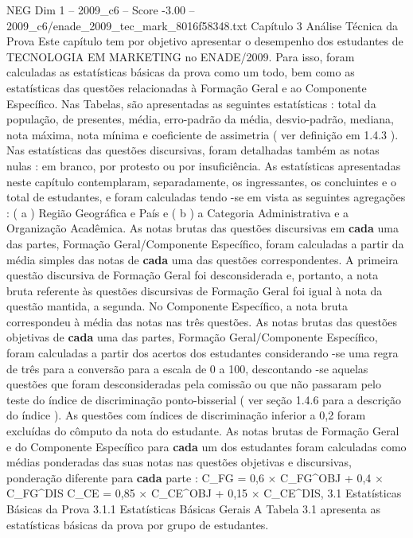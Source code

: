 \begin{textsample}{NEG Dim 1 – 2009\_c6 – Score -3.00 – 2009\_c6/enade\_2009\_tec\_mark\_8016f58348.txt}  \label{ex:f1_neg_214}
Capítulo 3 Análise Técnica da Prova Este capítulo tem por objetivo apresentar o desempenho dos estudantes de TECNOLOGIA EM MARKETING no ENADE/2009.
Para isso, foram calculadas as estatísticas básicas da prova como um todo, bem como as estatísticas das questões relacionadas à Formação Geral e ao Componente Específico.
Nas Tabelas, são apresentadas as seguintes estatísticas : total da população, de presentes, média, erro-padrão da média, desvio-padrão, mediana, nota máxima, nota mínima e coeficiente de assimetria ( ver definição em 1.4.3 ).
Nas estatísticas das questões discursivas, foram detalhadas também as notas nulas : em branco, por protesto ou por insuficiência.
As estatísticas apresentadas neste capítulo contemplaram, separadamente, os ingressantes, os concluintes e o total de estudantes, e foram calculadas tendo -se em vista as seguintes agregações : ( a ) Região Geográfica e País e ( b ) a Categoria Administrativa e a Organização Acadêmica.
As notas brutas das questões discursivas em \textbf{cada} uma das partes, Formação Geral/Componente Específico, foram calculadas a partir da média simples das notas de \textbf{cada} uma das questões correspondentes.
A primeira questão discursiva de Formação Geral foi desconsiderada e, portanto, a nota bruta referente às questões discursivas de Formação Geral foi igual à nota da questão mantida, a segunda.
No Componente Específico, a nota bruta correspondeu à média das notas nas três questões.
As notas brutas das questões objetivas de \textbf{cada} uma das partes, Formação Geral/Componente Específico, foram calculadas a partir dos acertos dos estudantes considerando -se uma regra de três para a conversão para a escala de 0 a 100, descontando -se aquelas questões que foram desconsideradas pela comissão ou que não passaram pelo teste do índice de discriminação ponto-bisserial ( ver seção 1.4.6 para a descrição do índice ).
As questões com índices de discriminação inferior a 0,2 foram excluídas do cômputo da nota do estudante.
As notas brutas de Formação Geral e do Componente Específico para \textbf{cada} um dos estudantes foram calculadas como médias ponderadas das suas notas nas questões objetivas e discursivas, ponderação diferente para \textbf{cada} parte : C\_FG = 0,6 × C\_FG\textasciicircum{}OBJ + 0,4 × C\_FG\textasciicircum{}DIS C\_CE = 0,85 × C\_CE\textasciicircum{}OBJ + 0,15 × C\_CE\textasciicircum{}DIS, 3.1 Estatísticas Básicas da Prova 3.1.1 Estatísticas Básicas Gerais A Tabela 3.1 apresenta as estatísticas básicas da prova por grupo de estudantes.

\end{textsample}
